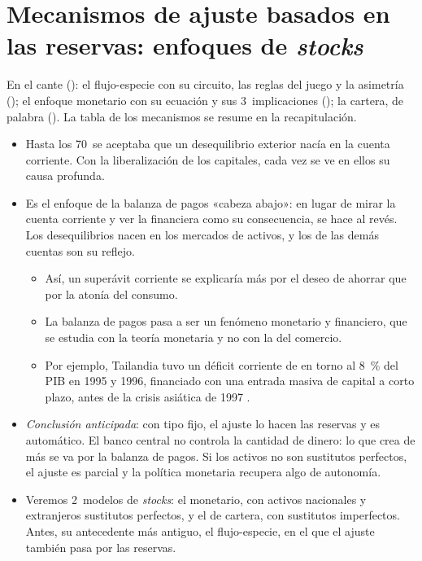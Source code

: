 \documentclass[11pt]{article}
\begin{document}
\section{Mecanismos de ajuste basados en las reservas:\cortetitulo{} enfoques de \emph{stocks}}\label{sec:stocks}

\begin{notaopositor}
En el cante (): el flujo-especie con su circuito, las reglas del juego y la asimetría (); el enfoque monetario con su ecuación y sus 3~implicaciones (); la cartera, de palabra (). La tabla de los mecanismos se resume en la recapitulación.
\end{notaopositor}

\begin{itemize}
\item Hasta los 70~se aceptaba que un desequilibrio exterior nacía en la cuenta corriente. Con la liberalización de los capitales, cada vez se ve en ellos su causa profunda.
\item Es el enfoque de la balanza de pagos «cabeza abajo»: en lugar de mirar la cuenta corriente y ver la financiera como su consecuencia, se hace al revés. Los desequilibrios nacen en los mercados de activos, y los de las demás cuentas son su reflejo.
  \begin{itemize}
  \item Así, un superávit corriente se explicaría más por el deseo de ahorrar que por la atonía del consumo.
  \item La balanza de pagos pasa a ser un fenómeno monetario y financiero, que se estudia con la teoría monetaria y no con la del comercio.
  \item Por ejemplo, Tailandia tuvo un déficit corriente de en torno al 8~\% del PIB en 1995 y 1996, financiado con una entrada masiva de capital a corto plazo, antes de la crisis asiática de 1997\nocite{FMI1997WEOdic} .
  \end{itemize}
\item \emph{Conclusión anticipada}: con tipo fijo, el ajuste lo hacen las reservas y es automático. El banco central no controla la cantidad de dinero: lo que crea de más se va por la balanza de pagos. Si los activos no son sustitutos perfectos, el ajuste es parcial y la política monetaria recupera algo de autonomía.
\item Veremos 2~modelos de \emph{stocks}: el monetario, con activos nacionales y extranjeros sustitutos perfectos, y el de cartera, con sustitutos imperfectos. Antes, su antecedente más antiguo, el flujo-especie, en el que el ajuste también pasa por las reservas.
\end{itemize}
\end{document}

